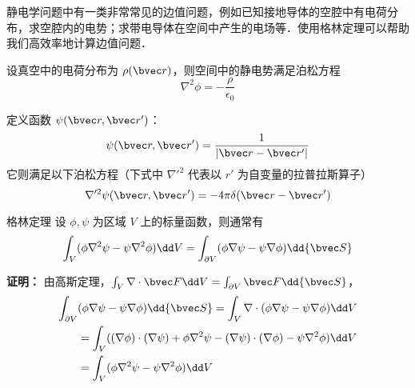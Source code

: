 

静电学问题中有一类非常常见的边值问题，例如已知接地导体的空腔中有电荷分布，求空腔内的电势；求带电导体在空间中产生的电场等．使用格林定理可以帮助我们高效率地计算边值问题．

设真空中的电荷分布为 $\rho(\bvec r)$，则空间中的静电势满足泊松方程
\begin{equation}\label{EleGr_eq1}
\nabla^2 \phi = -\frac{\rho}{\epsilon_0}
\end{equation}

定义函数 $\psi(\bvec r,\bvec r')$：
\begin{equation}
\psi(\bvec r,\bvec r')=\frac{1}{|\bvec r-\bvec r'|}
\end{equation}
它则满足以下泊松方程（下式中 $\nabla'^2$ 代表以 $r'$ 为自变量的拉普拉斯算子）
\begin{equation}\label{EleGr_eq2}
\nabla'^2 \psi(\bvec r,\bvec r')=-4\pi\delta(\bvec r-\bvec r')
\end{equation}

\begin{theorem}{格林定理}
设 $\phi,\psi$ 为区域 $V$ 上的标量函数，则通常有
\begin{equation}\label{EleGr_eq3}
\int_V (\phi \nabla^2 \psi -\psi\nabla^2\phi)\dd V=\int_{\partial V}(\phi \nabla \psi-\psi\nabla\phi)\dd {\bvec S} 
\end{equation}
\end{theorem}
\textbf{证明：} 由高斯定理，$\int_V \nabla\cdot \bvec F\dd V=\int_{\partial V}\bvec F \dd {\bvec S}$，
\begin{equation}
\begin{aligned}
\int_{\partial V}&(\phi\nabla\psi-\psi\nabla\phi)\dd{\bvec S}=\int_V \nabla \cdot (\phi\nabla\psi-\psi\nabla\phi)\dd V\\
&=\int_V((\nabla\phi)\cdot(\nabla\psi)+\phi\nabla^2\psi-(\nabla\psi)\cdot(\nabla\phi)-\psi\nabla^2\phi)\dd V\\
&=\int_V(\phi\nabla^2\psi-\psi\nabla^2\phi)\dd V
\end{aligned}
\end{equation}

